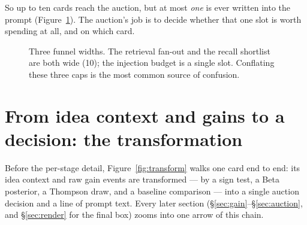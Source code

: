 \documentclass[11pt]{article}
\newcommand{\code}[1]{\texttt{\small #1}}
\begin{document}
So up to ten cards reach the auction, but at most \emph{one} is ever written into
the prompt (Figure~\ref{fig:funnel}). The auction's job is to decide whether that
one slot is worth spending at all, and on which card.

\begin{figure}[ht]
\centering
{}
\caption{Three funnel widths. The retrieval fan-out and the recall shortlist are
both wide (10); the injection budget is a single slot. Conflating these three caps
is the most common source of confusion.}
\label{fig:funnel}
\end{figure}

\section{From idea context and gains to a decision: the transformation}
\label{sec:transform}

Before the per-stage detail, Figure~\ref{fig:transform} walks one card end to end:
its idea context and raw gain events are transformed --- by a sign test, a
Beta posterior, a Thompson draw, and a baseline comparison --- into a single
auction decision and a line of prompt text. Every later section
(\S\ref{sec:gain}--\S\ref{sec:auction}, and \S\ref{sec:render} for the final
box) zooms into one arrow of this chain.
\end{document}
